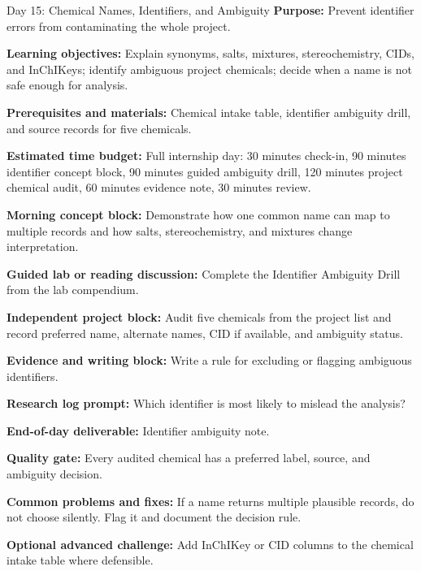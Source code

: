 \begin{dailybox}{Day 15: Chemical Names, Identifiers, and Ambiguity}
\textbf{Purpose:} Prevent identifier errors from contaminating the whole project.

\textbf{Learning objectives:} Explain synonyms, salts, mixtures, stereochemistry, CIDs, and InChIKeys; identify ambiguous project chemicals; decide when a name is not safe enough for analysis.

\textbf{Prerequisites and materials:} Chemical intake table, identifier ambiguity drill, and source records for five chemicals.

\textbf{Estimated time budget:} Full internship day: 30 minutes check-in, 90 minutes identifier concept block, 90 minutes guided ambiguity drill, 120 minutes project chemical audit, 60 minutes evidence note, 30 minutes review.

\textbf{Morning concept block:} Demonstrate how one common name can map to multiple records and how salts, stereochemistry, and mixtures change interpretation.

\textbf{Guided lab or reading discussion:} Complete the Identifier Ambiguity Drill from the lab compendium.

\textbf{Independent project block:} Audit five chemicals from the project list and record preferred name, alternate names, CID if available, and ambiguity status.

\textbf{Evidence and writing block:} Write a rule for excluding or flagging ambiguous identifiers.

\textbf{Research log prompt:} Which identifier is most likely to mislead the analysis?

\textbf{End-of-day deliverable:} Identifier ambiguity note.

\textbf{Quality gate:} Every audited chemical has a preferred label, source, and ambiguity decision.

\textbf{Common problems and fixes:} If a name returns multiple plausible records, do not choose silently. Flag it and document the decision rule.

\textbf{Optional advanced challenge:} Add InChIKey or CID columns to the chemical intake table where defensible.
\end{dailybox}

